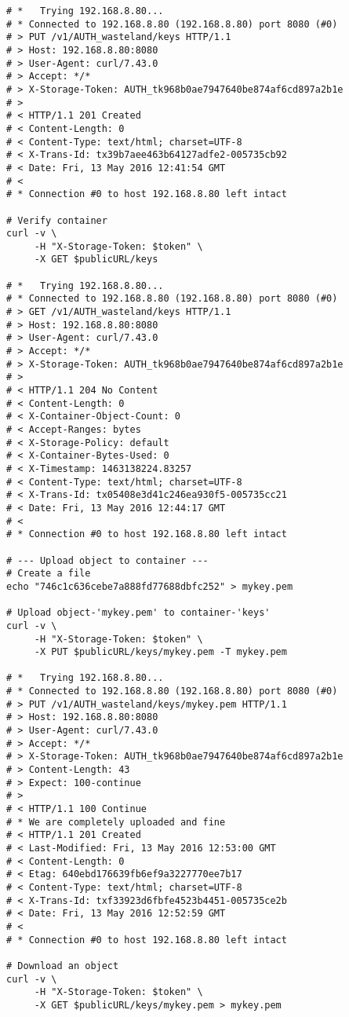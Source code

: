 \documentclass{article}
\begin{document}
\begin{itemize}
\begin{verbatim}
# *   Trying 192.168.8.80...
# * Connected to 192.168.8.80 (192.168.8.80) port 8080 (#0)
# > PUT /v1/AUTH_wasteland/keys HTTP/1.1
# > Host: 192.168.8.80:8080
# > User-Agent: curl/7.43.0
# > Accept: */*
# > X-Storage-Token: AUTH_tk968b0ae7947640be874af6cd897a2b1e
# >
# < HTTP/1.1 201 Created
# < Content-Length: 0
# < Content-Type: text/html; charset=UTF-8
# < X-Trans-Id: tx39b7aee463b64127adfe2-005735cb92
# < Date: Fri, 13 May 2016 12:41:54 GMT
# <
# * Connection #0 to host 192.168.8.80 left intact

# Verify container
curl -v \
	 -H "X-Storage-Token: $token" \
	 -X GET $publicURL/keys

# *   Trying 192.168.8.80...
# * Connected to 192.168.8.80 (192.168.8.80) port 8080 (#0)
# > GET /v1/AUTH_wasteland/keys HTTP/1.1
# > Host: 192.168.8.80:8080
# > User-Agent: curl/7.43.0
# > Accept: */*
# > X-Storage-Token: AUTH_tk968b0ae7947640be874af6cd897a2b1e
# >
# < HTTP/1.1 204 No Content
# < Content-Length: 0
# < X-Container-Object-Count: 0
# < Accept-Ranges: bytes
# < X-Storage-Policy: default
# < X-Container-Bytes-Used: 0
# < X-Timestamp: 1463138224.83257
# < Content-Type: text/html; charset=UTF-8
# < X-Trans-Id: tx05408e3d41c246ea930f5-005735cc21
# < Date: Fri, 13 May 2016 12:44:17 GMT
# <
# * Connection #0 to host 192.168.8.80 left intact

# --- Upload object to container ---
# Create a file
echo "746c1c636cebe7a888fd77688dbfc252" > mykey.pem

# Upload object-'mykey.pem' to container-'keys'
curl -v \
	 -H "X-Storage-Token: $token" \
	 -X PUT $publicURL/keys/mykey.pem -T mykey.pem

# *   Trying 192.168.8.80...
# * Connected to 192.168.8.80 (192.168.8.80) port 8080 (#0)
# > PUT /v1/AUTH_wasteland/keys/mykey.pem HTTP/1.1
# > Host: 192.168.8.80:8080
# > User-Agent: curl/7.43.0
# > Accept: */*
# > X-Storage-Token: AUTH_tk968b0ae7947640be874af6cd897a2b1e
# > Content-Length: 43
# > Expect: 100-continue
# >
# < HTTP/1.1 100 Continue
# * We are completely uploaded and fine
# < HTTP/1.1 201 Created
# < Last-Modified: Fri, 13 May 2016 12:53:00 GMT
# < Content-Length: 0
# < Etag: 640ebd176639fb6ef9a3227770ee7b17
# < Content-Type: text/html; charset=UTF-8
# < X-Trans-Id: txf33923d6fbfe4523b4451-005735ce2b
# < Date: Fri, 13 May 2016 12:52:59 GMT
# <
# * Connection #0 to host 192.168.8.80 left intact

# Download an object
curl -v \
	 -H "X-Storage-Token: $token" \
	 -X GET $publicURL/keys/mykey.pem > mykey.pem


\end{verbatim}
\end{itemize}
\end{document}
